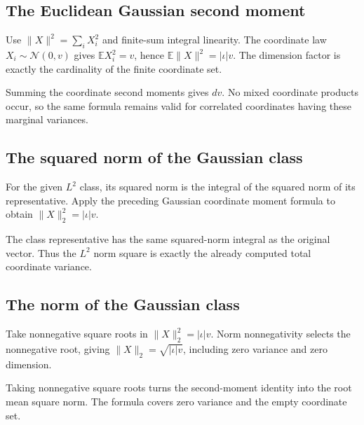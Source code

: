 \documentclass[11pt,a4paper]{report}
\begin{document}
\subsection{\texorpdfstring{The Euclidean Gaussian second moment}{The Euclidean Gaussian second moment}}
\label{report-step-UnadjustedLangevin-GaussianCoordinates-lean-2}


Use \(\|X\|^2=\sum_iX_i^2\) and finite-sum integral linearity. The coordinate law \(X_i\sim\mathcal N(0,v)\) gives \(\mathbb EX_i^2=v\), hence \(\mathbb E\|X\|^2=|\iota|v\). The dimension factor is exactly the cardinality of the finite coordinate set.



Summing the coordinate second moments gives \(dv\). No mixed coordinate products occur, so the same formula remains valid for correlated coordinates having these marginal variances.

\subsection{\texorpdfstring{The squared norm of the Gaussian class}{The squared norm of the Gaussian class}}
\label{report-step-UnadjustedLangevin-GaussianCoordinates-lean-3}


For the given \(L^2\) class, its squared norm is the integral of the squared norm of its representative. Apply the preceding Gaussian coordinate moment formula to obtain \(\|X\|_2^2=|\iota|v\).



The class representative has the same squared-norm integral as the original vector. Thus the \(L^2\) norm square is exactly the already computed total coordinate variance.

\subsection{\texorpdfstring{The norm of the Gaussian class}{The norm of the Gaussian class}}
\label{report-step-UnadjustedLangevin-GaussianCoordinates-lean-4}


Take nonnegative square roots in \(\|X\|_2^2=|\iota|v\). Norm nonnegativity selects the nonnegative root, giving \(\|X\|_2=\sqrt{|\iota|v}\), including zero variance and zero dimension.



Taking nonnegative square roots turns the second-moment identity into the root mean square norm. The formula covers zero variance and the empty coordinate set.
\end{document}

